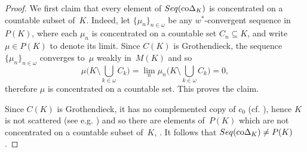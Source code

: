 \documentclass[12pt]{amsart}
\newcommand{\sub}{\subseteq}
\newcommand{\0}{\protect{\bf 0}}
\newcommand{\1}{\protect{\bf 1}}
\theoremstyle{definition}
\theoremstyle{remark}
\numberwithin{equation}{section}
\begin{document}
\begin{proof} We first claim that every element of $Seq({\rm co}\Delta_K)$ is concentrated on a countable subset of~$K$. Indeed,
let $\{\mu_n\}_{n\in \omega}$ be any $w^\ast$-convergent sequence in~$P(K)$, where 
each $\mu_n$ is concentrated on a countable set $C_n\sub K$, and 
write $\mu \in P(K)$ to denote its limit.
Since $C(K)$ is Grothendieck, the sequence $\{\mu_n\}_{n\in \omega}$ converges to~$\mu$ weakly in~$M(K)$ and so
$$
	\mu\Big(K\setminus \bigcup_{k\in \omega} C_k\Big) = \lim_n \mu_n\Big(K\setminus \bigcup_{k\in\omega} C_k\Big) = 0,
$$ 
therefore $\mu$ is concentrated on a countable set. This proves the claim.

Since $C(K)$ is Grothendieck, it has no complemented copy of $c_0$ (cf. \cite[p.~179]{die-uhl-J}), 
hence $K$ is not scattered (see e.g. \cite[Theorem~12.30]{fab-alt-J}) and so
there are elements of~$P(K)$ which are not concentrated on a countable subset of~$K$, 
\cite[Theorem 19.7.6]{semadeni}.
It follows that $Seq({\rm co}\Delta_K) \neq P(K)$. 
\end{proof}
\end{document}
